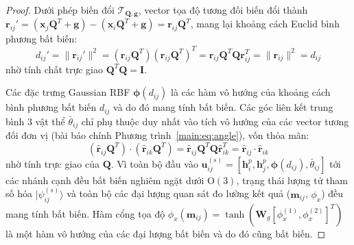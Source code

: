 \documentclass[10pt,twocolumn,letterpaper]{article}
\begin{document}
\begin{proof}
Dưới phép biến đổi $\mathcal{T}_{\mathbf{Q}, \mathbf{g}}$, vector tọa độ tương đối biến đổi thành $\mathbf{r}_{ij}' = (\mathbf{x}_j\mathbf{Q}^T + \mathbf{g}) - (\mathbf{x}_i\mathbf{Q}^T + \mathbf{g}) = \mathbf{r}_{ij}\mathbf{Q}^T$, mang lại khoảng cách Euclid bình phương bất biến:
\begin{equation}
    d_{ij}' = \|\mathbf{r}_{ij}'\|^2 = (\mathbf{r}_{ij}\mathbf{Q}^T)(\mathbf{r}_{ij}\mathbf{Q}^T)^T = \mathbf{r}_{ij}\mathbf{Q}^T\mathbf{Q}\mathbf{r}_{ij}^T = \|\mathbf{r}_{ij}\|^2 = d_{ij}
\end{equation}
nhờ tính chất trực giao $\mathbf{Q}^T\mathbf{Q} = \mathbf{I}$.

Các đặc trưng Gaussian RBF $\boldsymbol{\phi}(d_{ij})$ là các hàm vô hướng của khoảng cách bình phương bất biến $d_{ij}$ và do đó mang tính bất biến. Các góc liên kết trung bình 3 vật thể $\bar{\theta}_{ij}$ chỉ phụ thuộc duy nhất vào tích vô hướng của các vector tương đối đơn vị (bài báo chính Phương trình~\ref{main:eq:angle}), vốn thỏa mãn:
\begin{equation}
    (\hat{\mathbf{r}}_{ij}\mathbf{Q}^T) \cdot (\hat{\mathbf{r}}_{ik}\mathbf{Q}^T) = \hat{\mathbf{r}}_{ij}\mathbf{Q}^T\mathbf{Q}\hat{\mathbf{r}}_{ik}^T = \hat{\mathbf{r}}_{ij} \cdot \hat{\mathbf{r}}_{ik}
\end{equation}
nhờ tính trực giao của $\mathbf{Q}$. Vì toàn bộ đầu vào $\mathbf{u}_{ij}^{(s)} = [\mathbf{h}_i^p, \mathbf{h}_j^p, \boldsymbol{\phi}(d_{ij}), \bar{\theta}_{ij}]$ tới các nhánh cạnh đều bất biến nghiêm ngặt dưới $\mathrm{O}(3)$, trạng thái lượng tử tham số hóa $|\psi_{ij}^{(s)}\rangle$ và toàn bộ các đại lượng quan sát đo lường kết quả ($\mathbf{m}_{ij}$, $\phi_x$) đều mang tính bất biến. Hàm cổng tọa độ $\phi_x(\mathbf{m}_{ij}) = \tanh(\mathbf{W}_g [\phi_x^{(1)}, \phi_x^{(2)}]^T)$ là một hàm vô hướng của các đại lượng bất biến và do đó cũng bất biến.


\end{proof}
\end{document}
